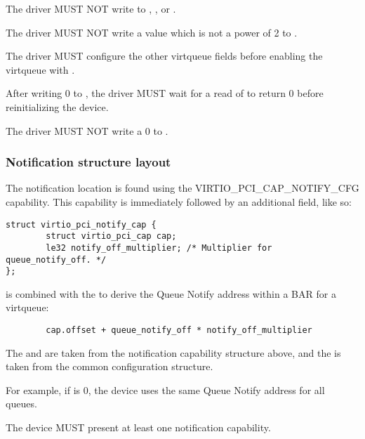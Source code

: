 The driver MUST NOT write to , ,  or .

The driver MUST NOT write a value which is not a power of 2 to .

The driver MUST configure the other virtqueue fields before enabling the virtqueue
with .

After writing 0 to , the driver MUST wait for a read of
 to return 0 before reinitializing the device.

The driver MUST NOT write a 0 to .

\subsubsection{Notification structure layout}\label{sec:Virtio Transport Options / Virtio Over PCI Bus / PCI Device Layout / Notification capability}

The notification location is found using the VIRTIO_PCI_CAP_NOTIFY_CFG
capability.  This capability is immediately followed by an additional
field, like so:

\begin{lstlisting}
struct virtio_pci_notify_cap {
        struct virtio_pci_cap cap;
        le32 notify_off_multiplier; /* Multiplier for queue_notify_off. */
};
\end{lstlisting}

 is combined with the  to
derive the Queue Notify address within a BAR for a virtqueue:

\begin{lstlisting}
        cap.offset + queue_notify_off * notify_off_multiplier
\end{lstlisting}

The  and  are taken from the
notification capability structure above, and the  is
taken from the common configuration structure.

\begin{note}
For example, if  is 0, the device uses
the same Queue Notify address for all queues.
\end{note}

The device MUST present at least one notification capability.


